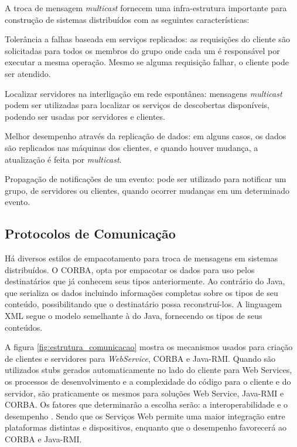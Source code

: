 \documentclass[
	12pt,				%
	oneside,			%
	a4paper,			%
	english,			%
	brazil				%
	]{abntex2ppgsi}
\begin{document}
A troca de mensagem \textit{multicast} fornecem uma infra-estrutura importante para construção de sistemas distribuídos com as seguintes características:

\begin{itemize*}
	\item{Tolerância a falhas baseada em serviços replicados: as requisições do cliente são solicitadas para todos os membros do grupo onde cada um é responsável por executar a mesma operação. Mesmo se alguma requisição falhar, o cliente pode ser atendido.}
	\item{Localizar servidores na interligação em rede espontânea: mensagens \textit{multicast} podem ser utilizadas para localizar os serviços de descobertas disponíveis, podendo ser usadas por servidores e clientes.}
	\item{Melhor desempenho através da replicação de dados: em alguns casos, os dados são replicados nas máquinas dos clientes, e quando houver mudança, a atualização é feita por \textit{multicast}.}
	\item{Propagação de notificações de um evento: pode ser utilizado para notificar um grupo, de servidores ou clientes, quando ocorrer mudanças em um determinado evento.}
\end{itemize*}


\subsection{Protocolos de Comunicação}

Há diversos estilos de empacotamento para troca de mensagens em sistemas distribuídos. O CORBA, opta por empacotar os dados para uso pelos destinatários que já conhecem seus tipos anteriormente. Ao contrário do Java, que serializa os dados incluindo informações completas sobre os tipos de seu conteúdo, possibilitando que o destinatário possa reconstruí-los. A linguagem XML segue o modelo semelhante à do Java, fornecendo os tipos de seus conteúdos. 

A figura \ref{fig:estrutura_comunicacao} mostra os mecanismos usados para criação de clientes e servidores para \textit{WebService}, CORBA e Java-RMI. Quando são utilizados stubs gerados automaticamente no lado do cliente para Web Services, os processos de desenvolvimento e a complexidade do código para o cliente e do servidor, são praticamente os mesmos para soluções Web Service, Java-RMI e CORBA. Os fatores que determinarão a escolha serão: a interoperabilidade e o desempenho \cite{gray2004comparison}. Sendo que os Serviços Web permite uma maior integração entre plataformas distintas e dispositivos, enquanto que o desempenho favorecerá ao CORBA e Java-RMI. 
\end{document}
